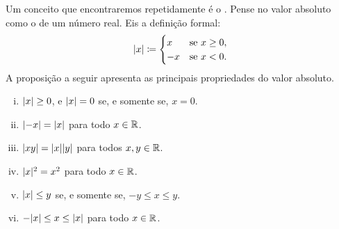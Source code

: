 Um conceito que encontraremos repetidamente é o
\emph{}.
Pense no valor absoluto como o  de um número real.
Eis a definição formal:
\begin{equation*}
\lvert {x} \rvert \coloneqq
\begin{cases}
x & \text{se } x \geq 0, \\
-x & \text{se } x < 0 .
\end{cases}
\end{equation*}
A proposição a seguir apresenta
as principais propriedades do valor
absoluto.

\begin{prop} \label{prop:absbas}
\leavevmode
\begin{enumerate}[(i)]
\item \label{prop:absbas:i} $\lvert {x} \rvert \geq 0$, e $\lvert {x} \rvert=0$ se, e somente se, $x = 0$.
\item \label{prop:absbas:ii} $\lvert {-x} \rvert = \lvert {x} \rvert$ para todo $x \in {\mathbb{R}}$.
\item \label{prop:absbas:iii} $\lvert {xy} \rvert = \lvert {x} \rvert\lvert {y} \rvert$ para todos $x,y \in {\mathbb{R}}$.
\item \label{prop:absbas:iv} $\lvert {x} \rvert^2 = x^2$ para todo $x \in {\mathbb{R}}$.
\item \label{prop:absbas:v} $\lvert {x} \rvert \leq y$ se, e somente se, $-y \leq x \leq y$.
\item \label{prop:absbas:vi} $-\lvert {x} \rvert \leq x \leq \lvert {x} \rvert$ para todo $x \in {\mathbb{R}}$.
\end{enumerate}
\end{prop}

